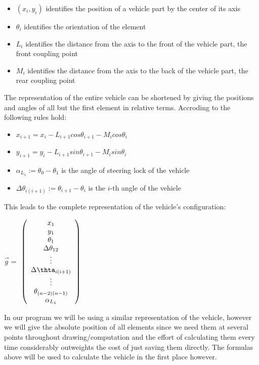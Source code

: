 \begin{itemize}
	\item $(x_i,y_i)$ identifies the position of a vehicle part by the center of its axis
	\item $\theta_i$ identifies the orientation of the element
	\item $L_i$ identifies the distance from the axis to the front of the vehicle part, the front coupling point
	\item $M_i$ identifies the distance from the axis to the back of the vehicle part, the rear coupling point
\end{itemize}

The representation of the entire vehicle can be shortened by giving the positions and angles of all but the first element in relative terms. Accroding to \cite{28} the following rules hold:
\begin{itemize}
	\item $x_{i+1}=x_i-L_{i+1} cos \theta_{i+1}-M_i cos \theta_i$
	\item $y_{i+1}=y_i-L_{i+1} sin \theta_{i+1}-M_i sin \theta_i$
	\item $\alpha_{L_1}:=\theta_0-\theta_1$ is the angle of steering lock of the vehicle
	\item $\Delta \theta_{i(i+1)}:= \theta_{i+1}-\theta_i$ is the $i$-th angle of the vehicle
\end{itemize}

This leads to the complete representation of the vehicle's configuration:
\begin{center}
$\vec{g}=$
$\left(
	\begin{array}{c}
		x_1\\
		y_1\\
		\theta_1\\
		\Delta \theta_{12}\\
		\vdots\\
		\Delta \thta_{i(i+1)}\\
		\vdots\\
		\theta_{(n-2)(n-1)}\\
		\alpha_{L_1} 
	\end{array}
\right)$
\end{center}

In our program we will be using a similar representation of the vehicle, however we will give the absolute position of all elements since we need them at several points throughout drawing/computation and the effort of calculating them every time considerably outweights the cost of just saving them directly. The formulas above will be used to calculate the vehicle in the first place however.


